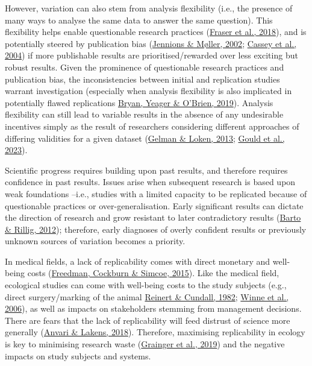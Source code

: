 \documentclass[10pt,a4paper]{article}
\begin{document}
However, variation can also stem from analysis flexibility (i.e., the presence of many ways to analyse the same data to answer the same question).
This flexibility helps enable questionable research practices (\protect\hyperlink{ref-fraser_questionable_2018}{Fraser et al., 2018}), and is potentially steered by publication bias (\protect\hyperlink{ref-jennions_publication_2002}{Jennions \& Møller, 2002}; \protect\hyperlink{ref-cassey_survey_2004}{Cassey et al., 2004}) if more publishable results are prioritised/rewarded over less exciting but robust results.
Given the prominence of questionable research practices and publication bias, the inconsistencies between initial and replication studies warrant investigation (especially when analysis flexibility is also implicated in potentially flawed replications \protect\hyperlink{ref-bryan_replicator_2019}{Bryan, Yeager \& O'Brien, 2019}).
Analysis flexibility can still lead to variable results in the absence of any undesirable incentives simply as the result of researchers considering different approaches of differing validities for a given dataset (\protect\hyperlink{ref-gelman_garden_2013}{Gelman \& Loken, 2013}; \protect\hyperlink{ref-gould_same_2023}{Gould et al., 2023}).

Scientific progress requires building upon past results, and therefore requires confidence in past results.
Issues arise when subsequent research is based upon weak foundations --i.e., studies with a limited capacity to be replicated because of questionable practices or over-generalisation.
Early significant results can dictate the direction of research and grow resistant to later contradictory results (\protect\hyperlink{ref-barto_dissemination_2012}{Barto \& Rillig, 2012}); therefore, early diagnoses of overly confident results or previously unknown sources of variation becomes a priority.

In medical fields, a lack of replicability comes with direct monetary and well-being costs (\protect\hyperlink{ref-freedman_economics_2015}{Freedman, Cockburn \& Simcoe, 2015}).
Like the medical field, ecological studies can come with well-being costs to the study subjects (e.g., direct surgery/marking of the animal \protect\hyperlink{ref-Reinert1982}{Reinert \& Cundall, 1982}; \protect\hyperlink{ref-Winne2006}{Winne et al., 2006}), as well as impacts on stakeholders stemming from management decisions.
There are fears that the lack of replicability will feed distrust of science more generally (\protect\hyperlink{ref-anvari_replicability_2018}{Anvari \& Lakens, 2018}).
Therefore, maximising replicability in ecology is key to minimising research waste (\protect\hyperlink{ref-grainger_evidence_2019}{Grainger et al., 2019}) and the negative impacts on study subjects and systems.
\end{document}
